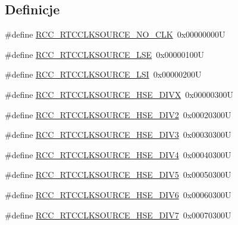 \subsection*{Definicje}
\begin{DoxyCompactItemize}
\item 
\#define \hyperlink{group___r_c_c___r_t_c___clock___source_gacce0b2f54d103340d8c3a218e86e295d}{R\+C\+C\+\_\+\+R\+T\+C\+C\+L\+K\+S\+O\+U\+R\+C\+E\+\_\+\+N\+O\+\_\+\+C\+LK}~0x00000000U
\item 
\#define \hyperlink{group___r_c_c___r_t_c___clock___source_ga5dca8d63f250a20bd6bc005670d0c150}{R\+C\+C\+\_\+\+R\+T\+C\+C\+L\+K\+S\+O\+U\+R\+C\+E\+\_\+\+L\+SE}~0x00000100U
\item 
\#define \hyperlink{group___r_c_c___r_t_c___clock___source_gab47a1afb8b5eef9f20f4772961d0a5f4}{R\+C\+C\+\_\+\+R\+T\+C\+C\+L\+K\+S\+O\+U\+R\+C\+E\+\_\+\+L\+SI}~0x00000200U
\item 
\#define \hyperlink{group___r_c_c___r_t_c___clock___source_ga2e3715826835647795863c32f9aebad7}{R\+C\+C\+\_\+\+R\+T\+C\+C\+L\+K\+S\+O\+U\+R\+C\+E\+\_\+\+H\+S\+E\+\_\+\+D\+I\+VX}~0x00000300U
\item 
\#define \hyperlink{group___r_c_c___r_t_c___clock___source_gac1ee63256acb5637e994abf629edaf3b}{R\+C\+C\+\_\+\+R\+T\+C\+C\+L\+K\+S\+O\+U\+R\+C\+E\+\_\+\+H\+S\+E\+\_\+\+D\+I\+V2}~0x00020300U
\item 
\#define \hyperlink{group___r_c_c___r_t_c___clock___source_ga242119dd2fc5e6ec6d7c2aa239dbcb9f}{R\+C\+C\+\_\+\+R\+T\+C\+C\+L\+K\+S\+O\+U\+R\+C\+E\+\_\+\+H\+S\+E\+\_\+\+D\+I\+V3}~0x00030300U
\item 
\#define \hyperlink{group___r_c_c___r_t_c___clock___source_ga0f45ba0fe6a8f125137d3cee8b49f7cc}{R\+C\+C\+\_\+\+R\+T\+C\+C\+L\+K\+S\+O\+U\+R\+C\+E\+\_\+\+H\+S\+E\+\_\+\+D\+I\+V4}~0x00040300U
\item 
\#define \hyperlink{group___r_c_c___r_t_c___clock___source_ga229473454f04d994e1ed1751d6b19e48}{R\+C\+C\+\_\+\+R\+T\+C\+C\+L\+K\+S\+O\+U\+R\+C\+E\+\_\+\+H\+S\+E\+\_\+\+D\+I\+V5}~0x00050300U
\item 
\#define \hyperlink{group___r_c_c___r_t_c___clock___source_gae541538e57fdf779b8f16202416c799a}{R\+C\+C\+\_\+\+R\+T\+C\+C\+L\+K\+S\+O\+U\+R\+C\+E\+\_\+\+H\+S\+E\+\_\+\+D\+I\+V6}~0x00060300U
\item 
\#define \hyperlink{group___r_c_c___r_t_c___clock___source_ga352febcf0ae6b14407f0e6aae66ffe11}{R\+C\+C\+\_\+\+R\+T\+C\+C\+L\+K\+S\+O\+U\+R\+C\+E\+\_\+\+H\+S\+E\+\_\+\+D\+I\+V7}~0x00070300U
\item 

\end{DoxyCompactItemize}
